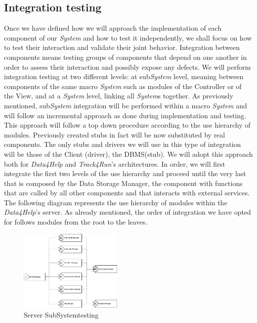 \documentclass[titlepage]{article}
\begin{document}
\subsection{Integration testing}
Once we have defined how we will approach the implementation of each component of our {\it System} and how to test it independently, we shall focus on how to test their interaction and validate their joint behavior. Integration between components means testing groups of components that depend on one another in order to assess their interaction and possibly expose any defects. We will perform integration testing at two different levels: at sub{\it System} level, meaning between components of the same macro {\it System} such as modules of the Controller or of the View, and at a {\it System} level, linking all {\it System}s together.
\newline
\newline
As previously mentioned, sub{\it System} integration will be performed within a macro {\it System} and will follow an incremental approach as done during implementation and testing. This approach will follow a top down procedure according to the use hierarchy of modules. Previously created stubs in fact will be now substituted by real components. The only stubs and drivers we will use in this type of integration will be those of the Client (driver), the DBMS(stub). We will adopt this approach both for {\it Data4Help} and {\it Track4Run}’s architectures. In order, we will first integrate the first two levels of the use hierarchy and proceed until the very last that is composed by the Data Storage Manager, the component with functions that are called by all other components and that interacts with external services. 
\newline
\newline
The following diagram represents the use hierarchy of modules within the {\it Data4Help}’s server. As already mentioned, the order of integration we have opted for follows modules from the root to the leaves.
\begin{figure}[H]
	\center
  	\includegraphics[width=5cm]{serverSubSystemTesting.png}
  	\caption{Server SubSystemtesting}
 	\label{fig:serverSubSystemTesting}
\end{figure}
\end{document}
